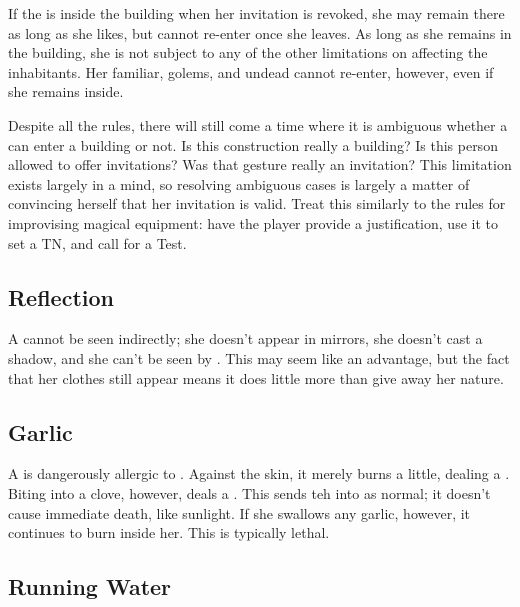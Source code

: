 If the {\vampire} is inside the building when her invitation is revoked, she may remain there as long as she likes, but cannot re-enter once she leaves.
As long as she remains in the building, she is not subject to any of the other limitations on affecting the inhabitants.
Her familiar, golems, and undead cannot re-enter, however, even if she remains inside.

Despite all the rules, there will still come a time where it is ambiguous whether a {\vampire} can enter a building or not.
Is this construction really a building?
Is this person allowed to offer invitations?
Was that gesture really an invitation?
This limitation exists largely in a {\vampirepossessive} mind, so resolving ambiguous cases is largely a matter of convincing herself that her invitation is valid.
Treat this similarly to the rules for improvising magical equipment: have the player provide a justification, use it to set a TN, and call for a  Test.

\subsection{Reflection}

A {\vampire} cannot be seen indirectly; she doesn't appear in mirrors, she doesn't cast a shadow, and she can't be seen by .
This may seem like an advantage, but the fact that her clothes still appear means it does little more than give away her {\vampiric} nature.

\subsection{Garlic}

A {\vampires} is dangerously allergic to .
Against the skin, it merely burns a little, dealing a  {\damagetest}.
Biting into a clove, however, deals a  {\damagetest}.
This {\damagetest} sends teh {\vampire} into {\shock} as normal; it doesn't cause immediate death, like sunlight.
If she swallows any garlic, however, it continues to burn inside her.
This is typically lethal.

\subsection{Running Water}



